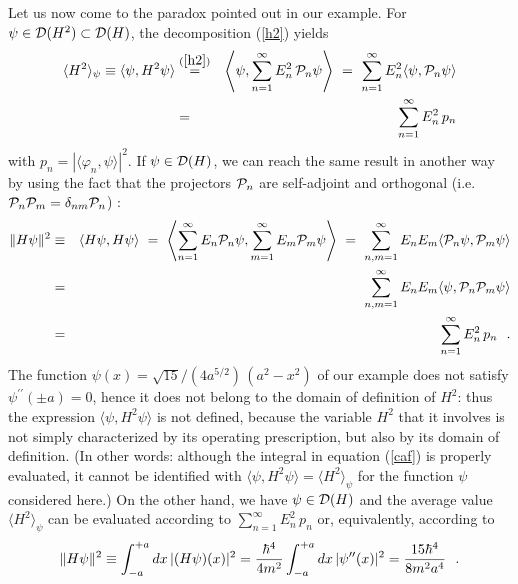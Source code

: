 \documentclass[a4wide,12pt]{report}
\begin{document}
Let us now come to the paradox pointed out in our example. For 
$\psi \in
{\cal D}(H^2) \subset {\cal D}(H)$,
 the decomposition (\ref{h2})
yields 
\begin{eqnarray}
\nonumber
\langle H^2 \rangle_{\psi} \equiv 
\langle \psi , H^2 \psi \rangle 
& \stackrel{(\ref{h2})}{=} & 
\left\langle \psi ,
\sum_{n=1}^{\infty} E_n^2 \, {\cal P}_n \psi \right\rangle 
\ = \ 
\sum_{n=1}^{\infty} E_n^2 \langle \psi , {\cal P}_n \psi \rangle
\\
&= &
\sum_{n=1}^{\infty} E_n^2 \, p_n  
\end{eqnarray}
 with $p_n = |  \langle \varphi_n , \psi \rangle  |^2$.
 If $\psi \in {\cal D} (H)$, we can reach the same result 
 in another way by using the fact that the projectors 
${\cal P}_n$ are self-adjoint and orthogonal 
(i.e. ${\cal P}_n {\cal P}_m = \delta_{nm} {\cal P}_n$) :
\begin{eqnarray}
\| H \psi \|^2 
&\equiv & 
\langle H \psi ,  H\psi \rangle
\ = \ \left\langle \sum_{n=1}^{\infty} E_n {\cal P}_n \psi ,
\sum_{m=1}^{\infty} E_m {\cal P}_m \psi \right\rangle 
\ = \ 
\sum_{n,m=1}^{\infty} E_n E_m \langle {\cal P}_n \psi , {\cal P}_m \psi
\rangle
\nonumber
\\
& = &
\sum_{n,m=1}^{\infty} E_n E_m \langle \psi , {\cal P}_n {\cal P}_m \psi
\rangle
\nonumber
\\
&=&
\sum_{n=1}^{\infty} E_n^2 \, p_n 
\ \ .
\end{eqnarray}
 The function
$\psi(x) = \sqrt{15}/(4a^{5/2}) \,
(a^2 - x^2)$ of our example does not satisfy  
$\psi^{\prime \prime} (\pm a) =0$, hence it does not belong 
to the domain of definition of $H^2$: thus the expression 
$\langle \psi, H^2 \psi \rangle$ is not defined, because the  
 variable $H^2$ that it involves is not simply characterized  by  
its operating prescription, but also by its domain of definition. 
(In other words: although the integral in equation
(\ref{caf}) is properly evaluated, it cannot be
identified with  $\langle \psi , H^2 \psi \rangle = \langle H^2
\rangle_{\psi}$ for the function $\psi$
considered here.)
On the other hand, we have $\psi \in {\cal D} (H)$ and the average value 
$\langle H^2 \rangle _{\psi}$
can be evaluated according to 
$\sum_{n=1}^{\infty} E_n^2 \, p_n$ 
or, equivalently, according to 
\[
\| H \psi \|^2 \equiv 
\int_{-a}^{+a} dx \, | (H\psi )(x) | ^2 =
\displaystyle{\hbar^4 \over 4m^2}
\int_{-a}^{+a} dx \, | \psi^{\prime \prime} (x) | ^2 =
\displaystyle{15 \hbar^4 \over 8m^2 a^4}
\ \ .
\]
 
 
\bigskip
 
\end{document}
